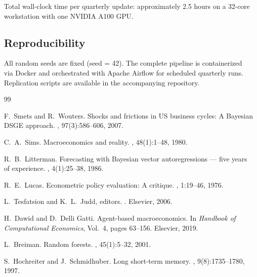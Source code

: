 \documentclass[12pt,a4paper]{article}
\begin{document}
Total wall-clock time per quarterly update: approximately 2.5 hours
on a 32-core workstation with one NVIDIA A100 GPU.

\subsection{Reproducibility}

All random seeds are fixed (seed = 42).  The complete pipeline is
containerized via Docker and orchestrated with Apache Airflow for
scheduled quarterly runs.  Replication scripts are available in the
accompanying repository.

\begin{thebibliography}{99}

F.~Smets and R.~Wouters.
\newblock Shocks and frictions in US business cycles: A Bayesian DSGE approach.
, 97(3):586--606, 2007.

C.~A.~Sims.
\newblock Macroeconomics and reality.
, 48(1):1--48, 1980.

R.~B.~Litterman.
\newblock Forecasting with Bayesian vector autoregressions --- five years of
experience.
, 4(1):25--38, 1986.

R.~E.~Lucas.
\newblock Econometric policy evaluation: A critique.
,
1:19--46, 1976.

L.~Tesfatsion and K.~L.~Judd, editors.
.
\newblock Elsevier, 2006.

H.~Dawid and D.~Delli Gatti.
\newblock Agent-based macroeconomics.
\newblock In {\em Handbook of Computational Economics}, Vol.\ 4, pages
63--156. Elsevier, 2019.

L.~Breiman.
\newblock Random forests.
, 45(1):5--32, 2001.

S.~Hochreiter and J.~Schmidhuber.
\newblock Long short-term memory.
, 9(8):1735--1780, 1997.


\end{thebibliography}
\end{document}
